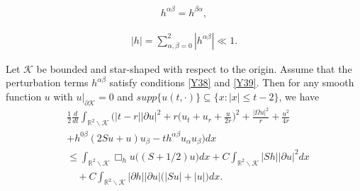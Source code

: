 \documentclass[10pt,a4paper]{amsart}
\def\leq{\leqslant}
\begin{document}
\begin{align}\label{Y38}
h^{\alpha\beta}=h^{\beta\alpha},
\end{align}

\begin{align}\label{Y39}
|h|=\sum_{\alpha,\beta=0}^2|h^{\alpha\beta}|\ll1.
\end{align}

\begin{lem}\label{lem5}
Let $\mathcal {K}$ be bounded and star-shaped with respect to the origin.
Assume that the perturbation terms $h^{\alpha\beta}$ satisfy conditions \eqref{Y38} and \eqref{Y39}.
Then for any smooth function $u$ with $u|_{\partial\mathcal {K}}=0$ and $supp\{u(t,\cdot)\}\subseteq\{x:|x|\leq t-2\}$, we have
\begin{align}\label{Y29}
&\frac12\frac{d}{dt}\int_{\mathbb R^2\backslash\mathcal
{K}}\bigg(|t-r||\partial u|^2+r\Big(u_t+u_r+\frac
u{2r}\Big)^2+\frac{|\Omega
u|^2}r+\frac {u^2}{4r}\nonumber\\&+h^{0\beta}(2Su+u)u_{\beta}
-th^{\alpha\beta}u_{\alpha}u_{\beta}\bigg)dx
\nonumber\\&\leq\int_{\mathbb R^2\backslash\mathcal {K}}\Box_h u
\big((S+1/2)u\big)dx+C\int_{\mathbb R^2\backslash\mathcal {K}}|Sh||\partial u|^2dx
\nonumber\\&\quad+C\int_{\mathbb R^2\backslash\mathcal {K}}|\partial h||\partial u|\big(|Su|+|u|\big)dx.
\end{align}
\end{lem}
\end{document}
